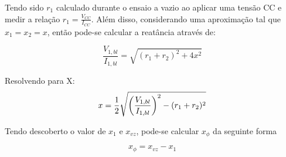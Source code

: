 \par Tendo sido $r_1$ calculado durante o ensaio a vazio ao aplicar uma tensão CC e medir a relação $r_1 = \frac{V_{CC}}{I_{CC}}$. Além disso, considerando uma aproximação tal que $x_1 = x_2 = x$, então pode-se calcular a reatância através de:

    $$ \frac{V_{1,bl}}{I_{1, bl}} = \sqrt{(r_1 + r_2)^2 + 4x^2}$$
    
\par Resolvendo para X:
    $$x = \frac{1}{2}\sqrt{\left(\frac{V_{1,bl}}{I_{1, bl}}\right)^2 - (r_1 + r_2)^2}$$
    
\par Tendo descoberto o valor de $x_1$ e $x_{vz}$, pode-se calcular $x_{\phi}$ da seguinte forma

    $$x_{\phi} = x_{vz} - x_1$$